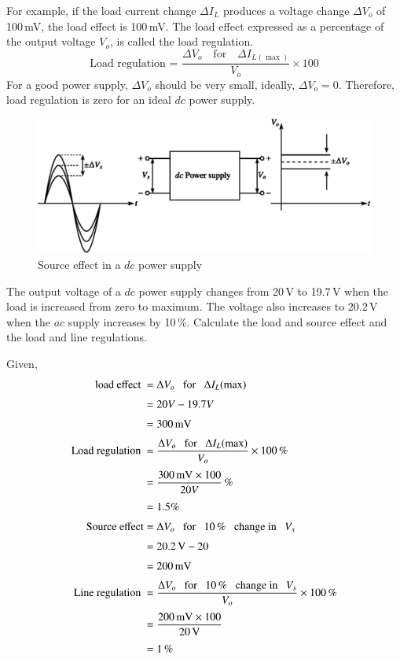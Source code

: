 For example, if the load current change $\Delta I_{L}$ produces a voltage change $\Delta V_{o}$ of 100\,mV, the load effect is 100\,mV. The load effect expressed as a percentage of the output voltage $V_{o}$, is called the load regulation.
\begin{equation}
\text{Load regulation = } \dfrac{\Delta V_{o}\text{~~ for~~ } \Delta I_{L(\max)}}{V_{o}}\times 100\label{eq2.77}
\end{equation}
For a good power supply, $\Delta V_{o}$ should be very small, ideally, $\Delta V_{o}=0$. Therefore, load regulation is zero for an ideal $dc$ power supply.
\setcounter{figure}{20}
\begin{figure}[H]
\centering
\includegraphics{chap2/fig2.21.eps}
\caption{Source effect in a $dc$ power supply}\label{fig2.21}
\end{figure}

\begin{example}\label{exam2.23}
The output voltage of a $dc$ power supply changes from 20\,V to 19.7\,V when the load is increased from zero to maximum. The voltage also increases to 20.2\,V when the $ac$ supply increases by 10\,\%. Calculate the load and source effect and the load and line regulations.
\end{example}

\begin{solution}
Given,
\begin{align*}
\text{load effect~} &= \Delta V_{o}\text{~~ for~~ }\Delta I_{L}(\max)\\[3pt]
&= 20V-19.7V\\[3pt]
&= 300\text{\,mV}\\[3pt]
\text{Load regulation~} &= \dfrac{\Delta V_{o}\text{~~ for~~ }\Delta I_{L}(\max)}{V_{o}}\times 100\,\%\\[3pt]
&= \frac{300\text{\,mV}\times 100}{20V}\,\%\\[3pt]
&= 1.5\%\\[3pt]
\text{Source effect} &= \Delta V_{o}\text{~~ for~~ } 10\,\%\text{~~ change in~~ } V_{s}\\[3pt]
&= 20.2\text{\,V}-20\\[3pt]
&= 200\text{\,mV}\\[3pt]
\text{Line regulation~} &= \frac{\Delta V_{o}\text{~~ for~~ } 10\,\%\text{~~ change in~~ }V_{s}}{V_{o}}\times 100\,\%\\[3pt]
&=\frac{200\text{\,mV}\times 100}{20\text{\,V}}\\[3pt]
&= 1\,\%
\end{align*}
\vskip -1cm
\end{solution}

